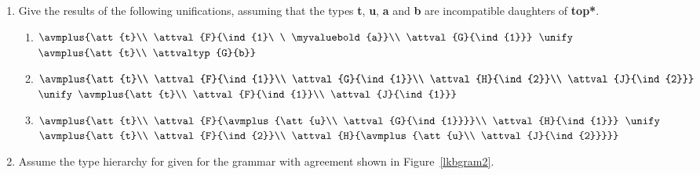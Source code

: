 \documentclass[12pt]{report}
\begin{document}
\begin{enumerate}
\item Give the results of the following unifications, assuming that the types
{\bf t}, {\bf u}, {\bf a} and {\bf b} are incompatible daughters of
{\bf *top*}.
\begin{enumerate}
\item {\tiny $\avmplus{\att{t}\\
             \attval{F}{\ind{1}\ \ \myvaluebold{a}}\\
             \attval{G}{\ind{1}}}$}
$\unify$ {\tiny $\avmplus{\att{t}\\
             \attvaltyp{G}{b}}$}
\item {\tiny $\avmplus{\att{t}\\
             \attval{F}{\ind{1}}\\
             \attval{G}{\ind{1}}\\
             \attval{H}{\ind{2}}\\
             \attval{J}{\ind{2}}}$}
$\unify$ {\tiny $\avmplus{\att{t}\\
             \attval{F}{\ind{1}}\\
             \attval{J}{\ind{1}}}$}
\item {\tiny $\avmplus{\att{t}\\
             \attval{F}{\avmplus{\att{u}\\
                                 \attval{G}{\ind{1}}}}\\
             \attval{H}{\ind{1}}}$}
$\unify$ {\tiny $\avmplus{\att{t}\\
             \attval{F}{\ind{2}}\\
             \attval{H}{\avmplus{\att{u}\\
                                 \attval{J}{\ind{2}}}}}$}
\end{enumerate}
\item Assume the type hierarchy for given for the
grammar with agreement shown in Figure~\ref{lkbgram2}.
\end{enumerate}
\end{document}
